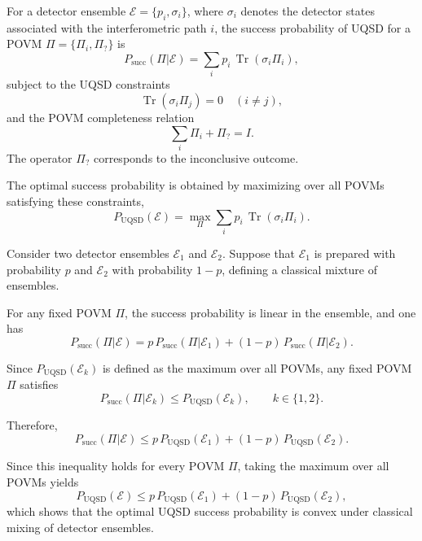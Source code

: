 \documentclass[aps,pra,reprint,superscriptaddress]{revtex4-2}
\begin{document}
For a detector ensemble $\mathcal{E}=\{p_i,\sigma_i\}$,
where $\sigma_i$ denotes the detector states associated
with the interferometric path $i$, the success probability
of UQSD for a POVM $\Pi=\{\Pi_i,\Pi_?\}$ is
\begin{equation}
P_{\mathrm{succ}}(\Pi|\mathcal{E})
=
\sum_i p_i\,\operatorname{Tr}(\sigma_i \Pi_i),
\end{equation}
subject to the UQSD constraints
\[
\operatorname{Tr}(\sigma_i \Pi_j)=0 \quad (i\neq j),
\]
and the POVM completeness relation
\[
\sum_i \Pi_i + \Pi_? = I .
\]
The operator $\Pi_?$ corresponds to the inconclusive outcome.

The optimal success probability is obtained by maximizing
over all POVMs satisfying these constraints,
\begin{equation}
P_{\mathrm{UQSD}}(\mathcal{E})
=
\max_{\Pi}
\sum_i p_i\,\operatorname{Tr}(\sigma_i \Pi_i).
\end{equation}

Consider two detector ensembles $\mathcal{E}_1$ and
$\mathcal{E}_2$. Suppose that $\mathcal{E}_1$ is prepared
with probability $p$ and $\mathcal{E}_2$ with probability
$1-p$, defining a classical mixture of ensembles.

For any fixed POVM $\Pi$, the success probability is linear
in the ensemble, and one has
\begin{equation}
P_{\mathrm{succ}}(\Pi|\mathcal{E})
=
p\,P_{\mathrm{succ}}(\Pi|\mathcal{E}_1)
+
(1-p)\,P_{\mathrm{succ}}(\Pi|\mathcal{E}_2).
\end{equation}

Since $P_{\mathrm{UQSD}}(\mathcal{E}_k)$ is defined as the
maximum over all POVMs, any fixed POVM $\Pi$ satisfies
\[
P_{\mathrm{succ}}(\Pi|\mathcal{E}_k)
\le
P_{\mathrm{UQSD}}(\mathcal{E}_k),
\qquad k\in\{1,2\}.
\]

Therefore,
\begin{equation}
P_{\mathrm{succ}}(\Pi|\mathcal{E})
\le
p\,P_{\mathrm{UQSD}}(\mathcal{E}_1)
+
(1-p)\,P_{\mathrm{UQSD}}(\mathcal{E}_2).
\end{equation}

Since this inequality holds for every POVM $\Pi$, taking the
maximum over all POVMs yields
\begin{equation}
P_{\mathrm{UQSD}}(\mathcal{E})
\le
p\,P_{\mathrm{UQSD}}(\mathcal{E}_1)
+
(1-p)\,P_{\mathrm{UQSD}}(\mathcal{E}_2),
\end{equation}
which shows that the optimal UQSD success probability is
convex under classical mixing of detector ensembles.
\end{document}
